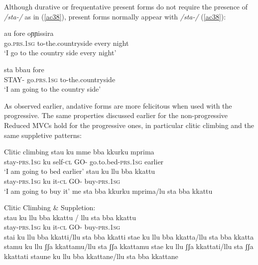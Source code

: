 \documentclass[output=paper]{langscibook}
\begin{document}
\ea\label{ac37}
    \z
\z

Although durative or frequentative present forms do not require the presence of \textit{/sta-/} as in (\ref{ac38}), present forms normally appear with \textit{/sta-/} (\ref{ac38}):

\ea \label{ac38}\gll  au        fore         oɲɲissira\\
   go.\textsc{prs}.\textsc{1sg}  to-the.countryside every night\\
 \glt  ‘I go to the country side every night’
\z

\ea \label{ac39}\gll sta    bbau       fore\\
   STAY- go.\textsc{prs}.\textsc{1sg}  to-the.countryside \\
\glt   ‘I am going to the country side’
\z

As observed earlier, andative forms are more felicitous when used with the progressive. The same properties discussed earlier for the non-progressive Reduced MVCs hold for the progressive ones, in particular clitic climbing and the same suppletive patterns:

\ea \label{ac40}Clitic climbing
    \ea \label{ac40a}
        \ea \gll stau       ku  mme   bba  kkurku      mprima\\
      stay-\textsc{prs}.\textsc{1sg} ku self-\textsc{cl}  GO- go.to.bed-\textsc{prs}.\textsc{1sg} earlier\\
      \glt ‘I am going to bed earlier’
        \ex \gll stau       ku   llu   bba   kkattu\\
      stay-\textsc{prs}.\textsc{1sg}  ku   it-\textsc{cl}  GO-  buy-\textsc{prs}.\textsc{1sg}\\
      \glt ‘I am going to buy it’
        \z
    \ex \label{ac40b}me sta bba kkurku mprima/lu sta bba kkattu
    \z
\z

\ea \label{ac41}Clitic Climbing \& Suppletion:\\
    \gll stau    ku     llu   bba  kkattu / llu sta bba kkattu\\
    stay-\textsc{prs}.\textsc{1sg} ku  it-\textsc{cl}  GO-  buy-\textsc{prs}.\textsc{1sg}\\
    \glt stai ku llu bba kkatti/llu sta bba kkatti 
    stae ku llu bba kkatta/llu sta bba kkatta      
    stamu ku llu ʃʃa kkattamu/llu sta ʃʃa kkattamu 
    stae ku llu ʃʃa kkattati/llu sta ʃʃa kkattati  
    staune ku llu bba kkattane/llu sta bba kkattane
\z
\end{document}
